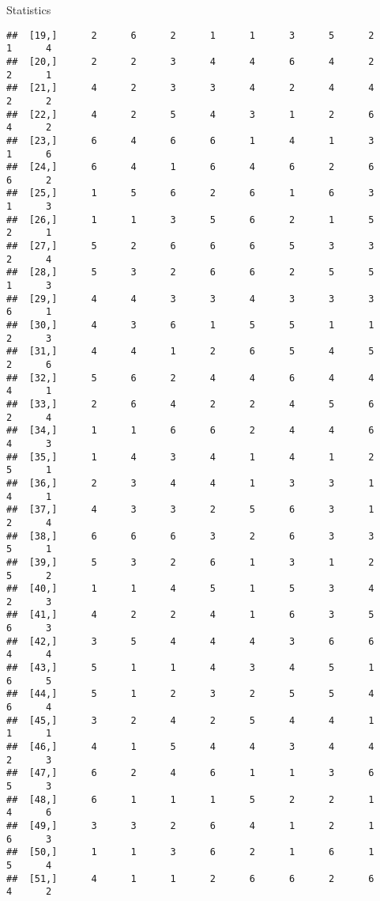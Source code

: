 \documentclass[
  ignorenonframetext,
]{beamer}
\begin{document}
\begin{frame}[fragile]{Statistics}
\begin{verbatim}
##  [19,]      2      6      2      1      1      3      5      2      1      4
##  [20,]      2      2      3      4      4      6      4      2      2      1
##  [21,]      4      2      3      3      4      2      4      4      2      2
##  [22,]      4      2      5      4      3      1      2      6      4      2
##  [23,]      6      4      6      6      1      4      1      3      1      6
##  [24,]      6      4      1      6      4      6      2      6      6      2
##  [25,]      1      5      6      2      6      1      6      3      1      3
##  [26,]      1      1      3      5      6      2      1      5      2      1
##  [27,]      5      2      6      6      6      5      3      3      2      4
##  [28,]      5      3      2      6      6      2      5      5      1      3
##  [29,]      4      4      3      3      4      3      3      3      6      1
##  [30,]      4      3      6      1      5      5      1      1      2      3
##  [31,]      4      4      1      2      6      5      4      5      2      6
##  [32,]      5      6      2      4      4      6      4      4      4      1
##  [33,]      2      6      4      2      2      4      5      6      2      4
##  [34,]      1      1      6      6      2      4      4      6      4      3
##  [35,]      1      4      3      4      1      4      1      2      5      1
##  [36,]      2      3      4      4      1      3      3      1      4      1
##  [37,]      4      3      3      2      5      6      3      1      2      4
##  [38,]      6      6      6      3      2      6      3      3      5      1
##  [39,]      5      3      2      6      1      3      1      2      5      2
##  [40,]      1      1      4      5      1      5      3      4      2      3
##  [41,]      4      2      2      4      1      6      3      5      6      3
##  [42,]      3      5      4      4      4      3      6      6      4      4
##  [43,]      5      1      1      4      3      4      5      1      6      5
##  [44,]      5      1      2      3      2      5      5      4      6      4
##  [45,]      3      2      4      2      5      4      4      1      1      1
##  [46,]      4      1      5      4      4      3      4      4      2      3
##  [47,]      6      2      4      6      1      1      3      6      5      3
##  [48,]      6      1      1      1      5      2      2      1      4      6
##  [49,]      3      3      2      6      4      1      2      1      6      3
##  [50,]      1      1      3      6      2      1      6      1      5      4
##  [51,]      4      1      1      2      6      6      2      6      4      2

\end{verbatim}
\end{frame}
\end{document}
